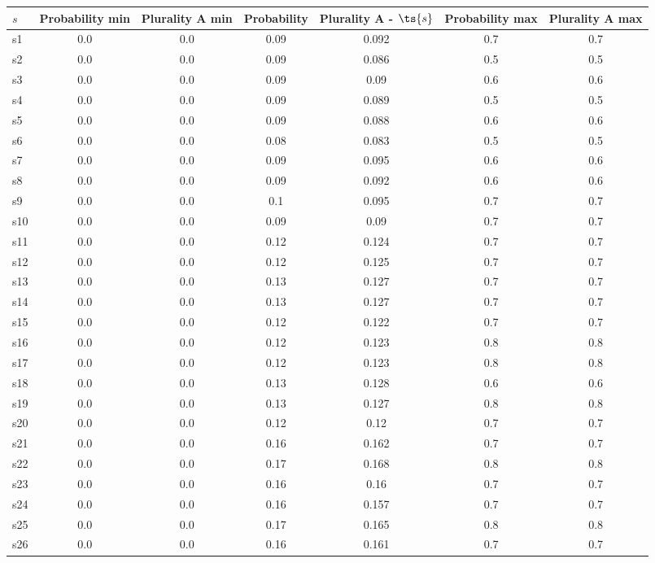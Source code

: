 \documentclass{article}
\begin{document}
\noindent\begin{tabular}{|l|c|c|c|c|c|c|}
\hline
$s$& Probability min & Plurality A min & Probability & Plurality A - $\ts{s}$ & Probability max & Plurality A max\\
\hline
s1 &0.0 & 0.0 & 0.09 & 0.092 & 0.7 & 0.7\\
\hline
s2 &0.0 & 0.0 & 0.09 & 0.086 & 0.5 & 0.5\\
\hline
s3 &0.0 & 0.0 & 0.09 & 0.09 & 0.6 & 0.6\\
\hline
s4 &0.0 & 0.0 & 0.09 & 0.089 & 0.5 & 0.5\\
\hline
s5 &0.0 & 0.0 & 0.09 & 0.088 & 0.6 & 0.6\\
\hline
s6 &0.0 & 0.0 & 0.08 & 0.083 & 0.5 & 0.5\\
\hline
s7 &0.0 & 0.0 & 0.09 & 0.095 & 0.6 & 0.6\\
\hline
s8 &0.0 & 0.0 & 0.09 & 0.092 & 0.6 & 0.6\\
\hline
s9 &0.0 & 0.0 & 0.1 & 0.095 & 0.7 & 0.7\\
\hline
s10 &0.0 & 0.0 & 0.09 & 0.09 & 0.7 & 0.7\\
\hline
s11 &0.0 & 0.0 & 0.12 & 0.124 & 0.7 & 0.7\\
\hline
s12 &0.0 & 0.0 & 0.12 & 0.125 & 0.7 & 0.7\\
\hline
s13 &0.0 & 0.0 & 0.13 & 0.127 & 0.7 & 0.7\\
\hline
s14 &0.0 & 0.0 & 0.13 & 0.127 & 0.7 & 0.7\\
\hline
s15 &0.0 & 0.0 & 0.12 & 0.122 & 0.7 & 0.7\\
\hline
s16 &0.0 & 0.0 & 0.12 & 0.123 & 0.8 & 0.8\\
\hline
s17 &0.0 & 0.0 & 0.12 & 0.123 & 0.8 & 0.8\\
\hline
s18 &0.0 & 0.0 & 0.13 & 0.128 & 0.6 & 0.6\\
\hline
s19 &0.0 & 0.0 & 0.13 & 0.127 & 0.8 & 0.8\\
\hline
s20 &0.0 & 0.0 & 0.12 & 0.12 & 0.7 & 0.7\\
\hline
s21 &0.0 & 0.0 & 0.16 & 0.162 & 0.7 & 0.7\\
\hline
s22 &0.0 & 0.0 & 0.17 & 0.168 & 0.8 & 0.8\\
\hline
s23 &0.0 & 0.0 & 0.16 & 0.16 & 0.7 & 0.7\\
\hline
s24 &0.0 & 0.0 & 0.16 & 0.157 & 0.7 & 0.7\\
\hline
s25 &0.0 & 0.0 & 0.17 & 0.165 & 0.8 & 0.8\\
\hline
s26 &0.0 & 0.0 & 0.16 & 0.161 & 0.7 & 0.7\\
\hline

\end{tabular}
\end{document}

